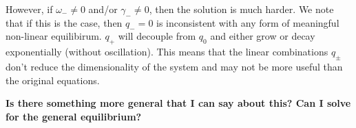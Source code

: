 However, if $\omega_{-} \neq 0$ and/or $\gamma_{-} \neq 0$, then the solution is much harder. We note that if this is the case, then $q_{-} = 0$ is inconsistent with any form of meaningful non-linear equilibirum. $q_{+}$ will decouple from $q_0$ and either grow or decay exponentially (without oscillation). This means that the linear combinations $q_{\pm}$ don't reduce the dimensionality of the system and may not be more useful than the original equations.

\textbf{Is there something more general that I can say about this? Can I solve for the general equilibrium?}

